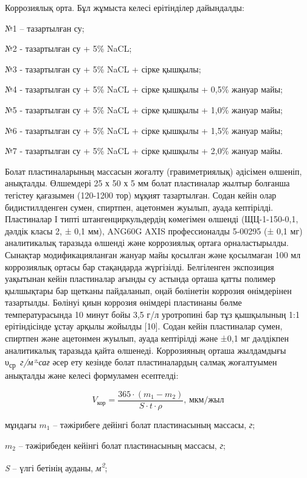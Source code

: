 \begin{multicols}{2}
Коррозиялық орта. Бұл жұмыста келесі ерітінділер дайындалды:

№1 -- тазартылған су;

№2 - тазартылған су + 5\% NaCL;

№3 - тазартылған су + 5\% NaCL + сірке қышқылы;

№4 - тазартылған су + 5\% NaCL + сірке қышқылы + 0,5\% жануар майы;

№5 - тазартылған су + 5\% NaCL + сірке қышқылы + 1,0\% жануар майы;

№6 - тазартылған су + 5\% NaCL + сірке қышқылы + 1,5\% жануар майы;

№7 - тазартылған су + 5\% NaCL + сірке қышқылы + 2,0\% жануар майы.

Болат пластиналарының массасын жоғалту (гравиметриялық) әдісімен
өлшеніп, анықталды. Өлшемдері 25 х 50 х 5 мм болат пластиналар жылтыр
болғанша тегістеу қағазымен (120-1200 тор) мұқият тазартылған. Содан
кейін олар бидистиллденген сумен, спиртпен, ацетонмен жуылып, ауада
кептірілді. Пластиналар I типті штангенциркульдердің көмегімен өлшенді
(ЩЦ-1-150-0,1, дәлдік класы 2, ± 0,1 мм), ANG60G AXIS профессионалды
5-00295 (± 0,1 мг) аналитикалық таразыда өлшенді және коррозиялық ортаға
орналастырылды. Сынақтар модификацияланған жануар майы қосылған және
қосылмаған 100 мл коррозиялық ортасы бар стақандарда жүргізілді.
Белгіленген экспозиция уақытынан кейін пластиналар ағынды су астында
орташа қатты полимер қылшықтары бар щетканы пайдаланып, оңай бөлінетін
коррозия өнімдерінен тазартылды. Бөлінуі қиын коррозия өнімдері
пластинаны бөлме температурасында 10 минут бойы 3,5 г/л уротропині бар
тұз қышқылының 1:1 ерітіндісінде ұстау арқылы жойылды {[}10{]}. Содан
кейін пластиналар сумен, спиртпен және ацетонмен жуылып, ауада
кептірілді және ±0,1 мг дәлдікпен аналитикалық таразыда қайта өлшенеді.
Коррозияның орташа жылдамдығы υ\textsubscript{ср}~\emph{г/м²∙сағ} әсер
ету кезінде болат пластиналардың салмақ жоғалтуымен анықталды және
келесі формуламен есептелді:


\begin{equation}
	V_{\text{кор}} = \frac{365 \cdot (m_1 - m_2)}{S \cdot t \cdot \rho}, \, \text{мкм/жыл}
	\end{equation}
	
мұндағы \(m_{1}\) -- тәжірибеге дейінгі болат пластинасының массасы,
\emph{г};

\(m_{2}\) -- тәжірибеден кейінгі болат пластинасының массасы, \emph{г};

\emph{S} -- үлгі бетінің ауданы, \emph{м\textsuperscript{2}};


\end{multicols}
